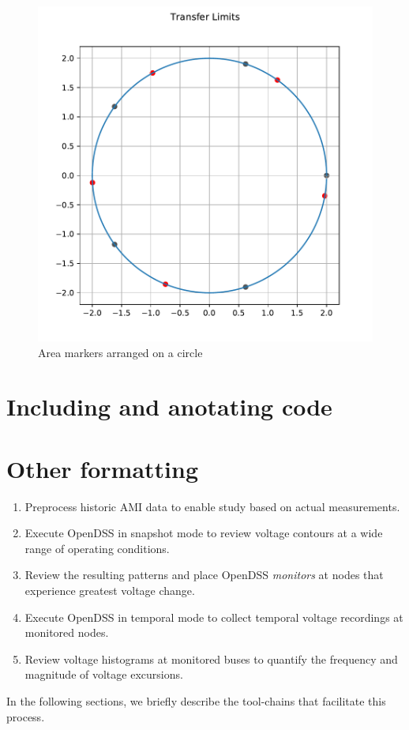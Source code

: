 \documentclass[12pt]{report}
\begin{document}
\begin{figure}%
  \centering %
  \includegraphics[scale=0.8, page=1]{visuals/Plots1}
  \caption[Area markers] {Area markers arranged on a circle} %
  \label{fig:1}
\end{figure}

\clearpage

\section{Including and anotating code}
\label{sec:code}

\singlespacing

\doublespacing

\section{Other formatting}

\singlespacing
\begin{enumerate}
  \item Preprocess historic AMI data to enable study based on actual measurements.
  \item Execute OpenDSS in snapshot mode to review voltage contours at a wide
        range of operating conditions.
  \item Review the resulting patterns and place OpenDSS \emph{monitors} at
        nodes that experience greatest voltage change.
  \item Execute OpenDSS in temporal mode to collect temporal voltage recordings
        at monitored nodes.
  \item Review voltage histograms at monitored buses to quantify the frequency
        and magnitude of voltage excursions.
\end{enumerate}
\doublespacing

In the following sections, we briefly describe the tool-chains that facilitate
this process.

\clearpage

% 

\clearpage
\end{document}

